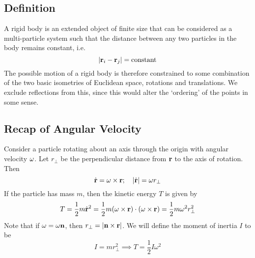 \subsection{Definition}
A rigid body is an extended object of finite size that can be considered as a multi-particle system such that the distance between any two particles in the body remains constant, i.e.
\[
	\abs{\vb r_i - \vb r_j} = \text{constant}
\]
The possible motion of a rigid body is therefore constrained to some combination of the two basic isometries of Euclidean space, rotations and translations.
We exclude reflections from this, since this would alter the `ordering' of the points in some sense.

\subsection{Recap of Angular Velocity}
Consider a particle rotating about an axis through the origin with angular velocity \(\vb \omega\).
Let \(r_\perp\) be the perpendicular distance from \(\vb r\) to the axis of rotation.
Then
\[
	\dot{\vb{r}} = \vb\omega \times \vb r;\quad \abs{\dot{\vb{r}}} = \omega r_\perp
\]
If the particle has mass \(m\), then the kinetic energy \(T\) is given by
\[
	T = \frac{1}{2}m\dot{\vb{r}}^2 = \frac{1}{2}m (\vb\omega \times \vb r) \cdot (\vb\omega \times \vb r) = \frac{1}{2}m\omega^2 r_\perp^2
\]
Note that if \(\vb\omega = \omega \vb n\), then \(r_\perp = \abs{\vb n \times \vb r}\).
We will define the moment of inertia \(I\) to be
\[
	I = mr_\perp^2 \implies T = \frac{1}{2}I\omega^2
\]

